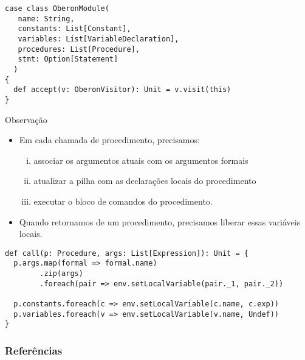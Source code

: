 \documentclass{beamer}
\begin{document}
\begin{frame}[fragile]
\begin{scriptsize}  
  \begin{lstlisting}
case class OberonModule(
   name: String,
   constants: List[Constant],
   variables: List[VariableDeclaration],
   procedures: List[Procedure],
   stmt: Option[Statement]
  )
{
  def accept(v: OberonVisitor): Unit = v.visit(this)
}
  \end{lstlisting}
\end{scriptsize}  
\end{frame}


\begin{frame}
  \begin{block}{Observa\c c\~{a}o}
   \begin{itemize}
   \item Em cada chamada de procedimento, precisamos:
     \begin{enumerate}[(i)]
      \item associar os argumentos atuais com os argumentos formais \faStar
      \item atualizar a pilha com as declara\c c\~{o}es locais do procedimento
      \item executar o bloco de comandos do procedimento. \pause
     \end{enumerate}   
    \item  Quando retornamos de um procedimento, precisamos {\color{blue}liberar}
     essas vari\'{a}veis locais.  
  \end{itemize}
 \end{block} 
\end{frame}

\begin{frame}[fragile]
  \begin{scriptsize}
    \begin{lstlisting}
def call(p: Procedure, args: List[Expression]): Unit = {
  p.args.map(formal => formal.name)
        .zip(args)
        .foreach(pair => env.setLocalVariable(pair._1, pair._2))

  p.constants.foreach(c => env.setLocalVariable(c.name, c.exp))
  p.variables.foreach(v => env.setLocalVariable(v.name, Undef))
}
    \end{lstlisting}  
  \end{scriptsize}
\end{frame}

\begin{frame}[t, allowframebreaks]
  \frametitle{Refer\^{e}ncias}
  
 
\end{frame}

\begin{frame}
\titlepage
\end{frame}
\end{document}
